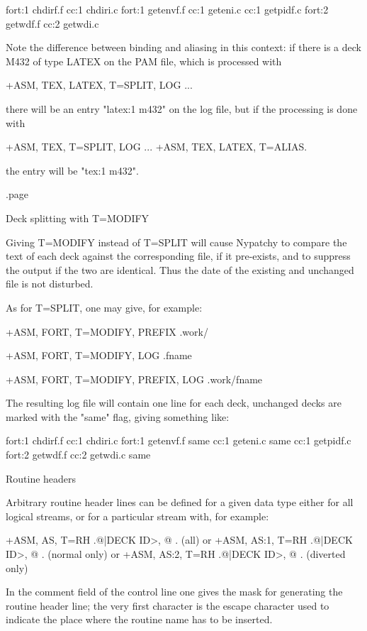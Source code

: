       fort:1    chdirf.f
      cc:1      chdiri.c
      fort:1    getenvf.f
      cc:1      geteni.c
      cc:1      getpidf.c
      fort:2    getwdf.f
      cc:2      getwdi.c

Note the difference between binding and aliasing in this context:
if there is a deck M432 of type LATEX on the PAM file, which is
processed with

      +ASM, TEX, LATEX, T=SPLIT, LOG  ...

there will be an entry "latex:1 m432" on the log file, but
if the processing is done with

      +ASM, TEX, T=SPLIT, LOG  ...
      +ASM, TEX, LATEX, T=ALIAS.

the entry will be "tex:1 m432".

.page
\item
Deck splitting with T=MODIFY

Giving T=MODIFY instead of T=SPLIT will cause Nypatchy to compare the text
of each deck against the corresponding file, if it pre-exists, and to
suppress the output if the two are identical. Thus the date of the existing
and unchanged file is not disturbed.

As for T=SPLIT, one may give, for example:

      +ASM, FORT, T=MODIFY, PREFIX        .work/

      +ASM, FORT, T=MODIFY, LOG           .fname

      +ASM, FORT, T=MODIFY, PREFIX, LOG   .work/fname

The resulting log file will contain one line for each deck, unchanged decks
are marked with the "same" flag, giving something like:

      fort:1    chdirf.f
      cc:1      chdiri.c
      fort:1    getenvf.f  same
      cc:1      geteni.c   same
      cc:1      getpidf.c
      fort:2    getwdf.f
      cc:2      getwdi.c   same


\item
Routine headers

Arbitrary routine header lines can be defined for a given data type either
for all logical streams, or for a particular stream with, for example:

      +ASM, AS,   T=RH   .@|DECK  ID>, @ .     (all)
  or  +ASM, AS:1, T=RH   .@|DECK  ID>, @ .     (normal only)
  or  +ASM, AS:2, T=RH   .@|DECK  ID>, @ .     (diverted only)

In the comment field of the control line one gives the mask for generating
the routine header line; the very first character is the escape character
used to indicate the place where the routine name has to be inserted.

